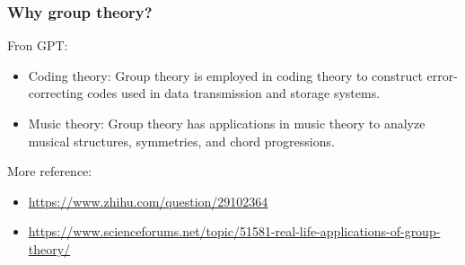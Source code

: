 \documentclass{beamer}
\begin{document}
\begin{frame}
    \frametitle{Why group theory?}

    \begin{block}{Fron GPT:}
        \begin{itemize}
            \item Coding theory: Group theory is employed in coding theory to construct error-correcting codes used in data transmission and storage systems.
            \item Music theory: Group theory has applications in music theory to analyze musical structures, symmetries, and chord progressions.
        \end{itemize}
    \end{block}
    More reference:
    \begin{itemize}
        \item \url{https://www.zhihu.com/question/29102364}
        \item \url{https://www.scienceforums.net/topic/51581-real-life-applications-of-group-theory/}
    \end{itemize}
\end{frame}
\end{document}
